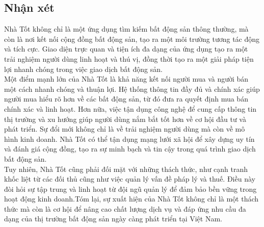 \subsection{Nhận xét}
\hspace*{1cm}Nhà Tốt không chỉ là một ứng dụng tìm kiếm bất động sản thông thường, mà còn là nơi kết nối cộng đồng bất động sản, tạo ra một môi trường tương tác động và tích cực. Giao diện trực quan và tiện ích đa dạng của ứng dụng tạo ra một trải nghiệm người dùng linh hoạt và thú vị, đồng thời tạo ra một giải pháp tiện lợi nhanh chóng trong việc giao dịch bất động sản.\\
\hspace*{1cm}Một điểm mạnh lớn của Nhà Tốt là khả năng kết nối người mua và người bán một cách nhanh chóng và thuận lợi. Hệ thống thông tin đầy đủ và chính xác giúp người mua hiểu rõ hơn về các bất động sản, từ đó đưa ra quyết định mua bán chính xác và linh hoạt. Hơn nữa, việc tận dụng công nghệ để cung cấp thông tin thị trường và xu hướng giúp người dùng nắm bắt tốt hơn về cơ hội đầu tư và phát triển. Sự đổi mới không chỉ là về trải nghiệm người dùng mà còn về mô hình kinh doanh. Nhà Tốt có thể tận dụng mạng lưới xã hội để xây dựng uy tín và đánh giá cộng đồng, tạo ra sự minh bạch và tin cậy trong quá trình giao dịch bất động sản.\\
\hspace*{1cm}Tuy nhiên, Nhà Tốt cũng phải đối mặt với những thách thức, như cạnh tranh khốc liệt từ các đối thủ cũng như việc quản lý vấn đề pháp lý và thuế. Điều này đòi hỏi sự tập trung và linh hoạt từ đội ngũ quản lý để đảm bảo bền vững trong hoạt động kinh doanh.Tóm lại, sự xuất hiện của Nhà Tốt không chỉ là một thách thức mà còn là cơ hội để nâng cao chất lượng dịch vụ và đáp ứng nhu cầu đa dạng của thị trường bất động sản ngày càng phát triển tại Việt Nam.